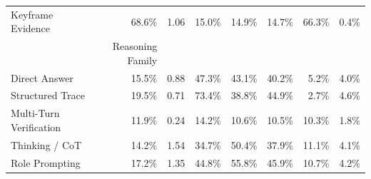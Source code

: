\begin{table}[t]
\begin{tabular}{lrrrrrrr}
  Keyframe Evidence                &  68.6\% & 1.06 &  15.0\% &  14.9\% &  14.7\% & 66.3\% &  0.4\% \\
\textbf{Prompting & Reasoning Family} & & & & & & \\
  Direct Answer                    &  15.5\% & 0.88 &  47.3\% &  43.1\% &  40.2\% &  5.2\% &  4.0\% \\
  Structured Trace                 &  19.5\% & 0.71 &  73.4\% &  38.8\% &  44.9\% &  2.7\% &  4.6\% \\
  Multi-Turn Verification          &  11.9\% & 0.24 &  14.2\% &  10.6\% &  10.5\% & 10.3\% &  1.8\% \\
  Thinking / CoT                   &  14.2\% & 1.54 &  34.7\% &  50.4\% &  37.9\% & 11.1\% &  4.1\% \\
  Role Prompting                   &  17.2\% & 1.35 &  44.8\% &  55.8\% &  45.9\% & 10.7\% &  4.2\% \\
\bottomrule
\end{tabular}
\end{table}
